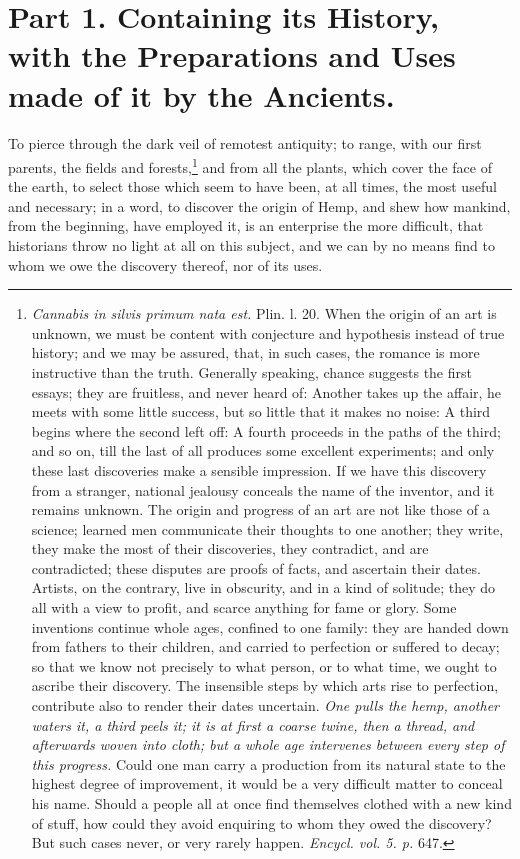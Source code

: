 \documentclass[a4paper, 11pt, oneside, polutonikogreek, english]{article}
\begin{document}
\section{Part 1. Containing its History, with the Preparations and Uses made of it by the Ancients.}
\paragraph{}
To pierce through the dark veil of remotest antiquity; to range, with our first parents, the fields and forests,\footnote{\emph{Cannabis in silvis primum nata est.} Plin. l. 20. When the origin of an art is unknown, we must be content with conjecture and hypothesis instead of true history; and we may be assured, that, in such cases, the romance is more instructive than the truth. Generally speaking, chance suggests the first essays; they are fruitless, and never heard of: Another takes up the affair, he meets with some little success, but so little that it makes no noise: A third begins where the second left off: A fourth proceeds in the paths of the third; and so on, till the last of all produces some excellent experiments; and only these last discoveries make a sensible impression. If we have this discovery from a stranger, national jealousy conceals the name of the inventor, and it remains unknown. The origin and progress of an art are not like those of a science; learned men communicate their thoughts to one another; they write, they make the most of their discoveries, they contradict, and are contradicted; these disputes are proofs of facts, and ascertain their dates. Artists, on the contrary, live in obscurity, and in a kind of solitude; they do all with a view to profit, and scarce anything for fame or glory. Some inventions continue whole ages, confined to one family: they are handed down from fathers to their children, and carried to perfection or suffered to decay; so that we know not precisely to what person, or to what time, we ought to ascribe their discovery. The insensible steps by which arts rise to perfection, contribute also to render their dates uncertain. \emph{One pulls the hemp, another waters it, a third peels it; it is at first a coarse twine, then a thread, and afterwards woven into cloth; but a whole age intervenes between every step of this progress.} Could one man carry a production from its natural state to the highest degree of improvement, it would be a very difficult matter to conceal his name. Should a people all at once find themselves clothed with a new kind of stuff, how could they avoid enquiring to whom they owed the discovery? But such cases never, or very rarely happen. \emph{Encycl. vol. 5. p.} 647.} and from all the plants, which cover the face of the earth, to select those which seem to have been, at all times, the most useful and necessary; in a word, to discover the origin of Hemp, and shew how mankind, from the beginning, have employed it, is an enterprise the more difficult, that historians throw no light at all on this subject, and we can by no means find to whom we owe the discovery thereof, nor of its uses.
\end{document}
